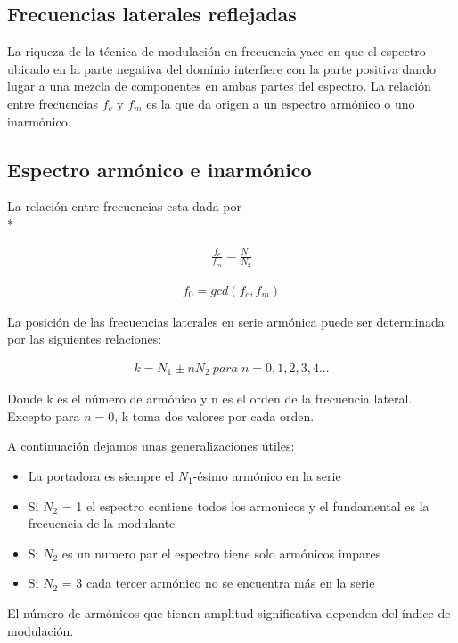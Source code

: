 \documentclass[assd_tp2_main.tex]{subfiles}
\begin{document}
\subsection{Frecuencias laterales reflejadas}
La riqueza de la técnica de modulación en frecuencia yace en que el espectro ubicado en la parte negativa del dominio interfiere con la parte positiva dando lugar a una mezcla de componentes en ambas partes del espectro. La relación entre frecuencias $f_c$ y $f_m$ es la que da origen a un espectro armónico o uno inarmónico.
\subsection{Espectro armónico e inarmónico}
La relación entre frecuencias esta dada por \\*

\begin{eqnarray*}
\displaystyle \frac{f_c}{f_m}=\frac{N_1}{N_2} 
\end{eqnarray*}
 
\begin{eqnarray*}
\displaystyle f_0=gcd(f_c,f_m)
\end{eqnarray*}
 
La posición de las frecuencias laterales en serie armónica puede ser determinada por las siguientes relaciones:

\begin{eqnarray*}
\displaystyle k = N_1 \pm nN_2 \: para\; n=0,1,2,3,4...
\end{eqnarray*}
\par
Donde k es el  número de armónico y n es el orden de la frecuencia lateral.
Excepto para $n=0$, k toma dos valores por cada orden.

A continuación dejamos unas generalizaciones útiles:
\begin{itemize}
\item La portadora es siempre el $N_1$-ésimo armónico  en la serie
\item Si $N_2$ = 1 el espectro contiene todos los armonicos	y el fundamental es la frecuencia de la modulante
\item Si $N_2$ es un numero par el espectro tiene solo armónicos impares
\item Si $N_2$ = 3 cada tercer armónico no se encuentra más en la serie
\end{itemize}
 

El número de armónicos que tienen amplitud significativa  dependen del índice de modulación.
\end{document}
